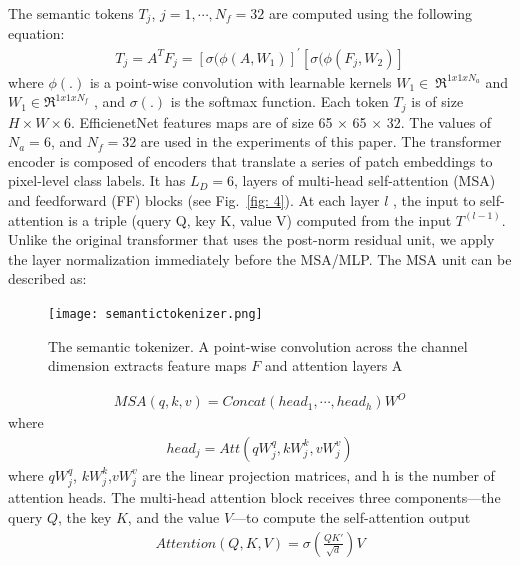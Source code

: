 \documentclass[journal]{IEEEtran}
\begin{document}
The semantic tokens $T_j$, $j=1, \cdots,{N_f}=32$ are computed using the following equation:
\begin{equation}
\label{eq:1}
\begin{aligned}
T_j = A^TF_j= [\sigma(\phi(A,W_1)]^{'}[\sigma(\phi(F_j,W_2)]
\end{aligned}
\end{equation}
where \(\phi(.)\) is a point-wise convolution with learnable kernels \( W_1 \in ~\Re ^{1x1xN_a}\)  and \(W_1 \in \Re ^{1x1xN_f}\) , and \(\sigma(.)\) is the softmax function. Each token $T_j$ is of size $H×W×6$.  EfficienetNet features maps are of size 65 × 65 × 32. The values of $N_a = 6$, and $N_f = 32$ are used in the experiments of this paper. 
The transformer encoder \cite{https://doi.org/10.48550/arxiv.2010.11929} is composed of encoders that translate a series of patch embeddings to pixel-level class labels. It has $L_D = 6$, layers of multi-head self-attention (MSA) and feedforward (FF) blocks (see Fig.~\ref{fig: 4}). At each layer $l$ , the input to self-attention is a triple (query Q, key K, value V) computed from the input $T^{(l-1)}$. Unlike the original transformer that uses the post-norm residual unit, we apply the layer normalization immediately before the MSA/MLP. The MSA unit can be described as: 
\begin{figure*}[]
\centering
    \texttt{[image: semantictokenizer.png]}\
\caption{The semantic tokenizer. A point-wise convolution across the channel dimension extracts feature maps $F$ and attention layers A}
\label{fig: 3}
\end{figure*}
\begin{equation}
\label{eq:2}
\begin{aligned}
MSA(q,k,v) = Concat(head_1, \cdots, head_h)W^O 
\end{aligned}
\end{equation}
where
\begin{equation}
\label{eq:3}
\begin{aligned}
head_j = Att(qW_{j}^{q}, kW_{j}^{k},vW_{j}^{v} ) 
\end{aligned}
\end{equation}
where $qW_{j}^{q}$, $kW_{j}^{k}$,$vW_{j}^{v}$ are the linear projection matrices, and h is the number of attention heads.
The multi-head attention block receives three components—the query $Q$, the key $K$, and the value $V$—to compute the self-attention output
\begin{equation}
\label{eq:4}
\begin{aligned}
Attention(Q,K,V) = \sigma \left(\frac{QK'} {\sqrt{d} }\right)V
\end{aligned}
\end{equation}
\end{document}
